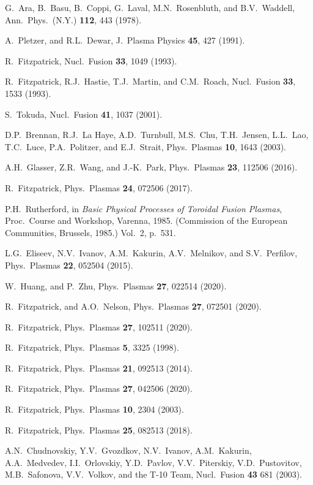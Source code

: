 \documentclass[12pt,prb,aps]{revtex4-1}
\begin{document}
\begin{thebibliography}{99}
 G.~Ara,  B.~Basu, B.~Coppi, G.~Laval, M.N.~Rosenbluth, and B.V.~Waddell, Ann.\ Phys.\ (N.Y.) {\bf 112}, 443 (1978). 

 A.~Pletzer, and R.L.~Dewar, J.\ Plasma Physics {\bf 45}, 427 (1991).

 R.~Fitzpatrick, Nucl.\ Fusion {\bf 33}, 1049 (1993).

 R.~Fitzpatrick, R.J.~Hastie, T.J.~Martin, and C.M.~Roach, Nucl.\ Fusion {\bf 33}, 1533 (1993).

 S.~Tokuda, Nucl.\ Fusion {\bf 41}, 1037 (2001).

 D.P.~Brennan, R.J.~La Haye, A.D.~Turnbull, M.S.~Chu, T.H.~Jensen, L.L.~Lao, T.C.~Luce, P.A.~Politzer, and E.J.~Strait,
Phys.\ Plasmas {\bf 10}, 1643 (2003).

 A.H.~Glasser, Z.R.~Wang, and J.-K.~Park, Phys.\ Plasmas {\bf 23}, 112506 (2016).

 R.~Fitzpatrick, Phys.\ Plasmas {\bf 24}, 072506 (2017). 

 P.H.~Rutherford, in  {\it Basic Physical Processes of
Toroidal Fusion Plasmas}, Proc.\ Course and Workshop, Varenna, 1985. (Commission of the European Communities, Brussels, 1985.) Vol.~2, p.~531.

 L.G.~Eliseev, N.V.~Ivanov, A.M.~Kakurin, A.V.~Melnikov, and S.V.~Perfilov, Phys.\ Plasmas {\bf 22}, 052504 (2015). 

 W.~Huang, and P.~Zhu, Phys.\ Plasmas {\bf 27}, 022514 (2020).

 R.~Fitzpatrick, and A.O.~Nelson, Phys.\ Plasmas {\bf 27}, 072501 (2020).

 R.~Fitzpatrick,  Phys.\ Plasmas {\bf 27}, 102511 (2020).

 R.~Fitzpatrick, Phys.\ Plasmas {\bf 5}, 3325 (1998).

 R.~Fitzpatrick, Phys.\ Plasmas {\bf 21}, 092513 (2014).

 R.~Fitzpatrick, Phys.\ Plasmas {\bf 27}, 042506 (2020).

 R.~Fitzpatrick, Phys.\ Plasmas {\bf 10}, 2304 (2003).

 R.~Fitzpatrick, Phys.\ Plasmas {\bf 25}, 082513 (2018).			

 A.N.~Chudnovskiy, Y.V.~Gvozdkov, N.V.~Ivanov, A.M.~Kakurin,
A.A.~Medvedev, I.I.~Orlovskiy, Y.D.~Pavlov, V.V.~Piterskiy, V.D.~Pustovitov,
M.B.~Safonova, V.V.~Volkov, and the T-10 Team, Nucl.\ Fusion {\bf 43} 681 (2003).


\end{thebibliography}
\end{document}
